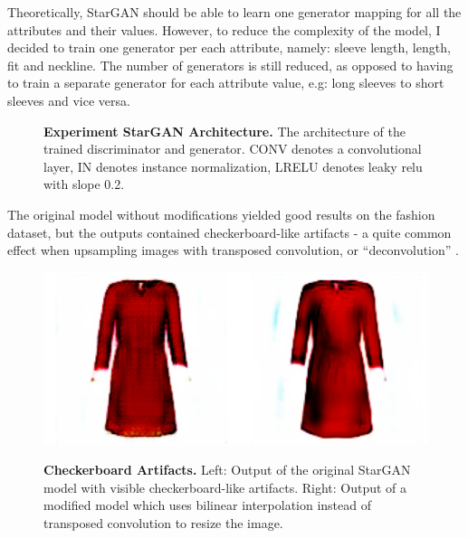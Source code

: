 \documentclass[12pt]{report}
\begin{document}
Theoretically, StarGAN should be able to learn one generator mapping for all the attributes and their values. However, to reduce the complexity of the model, I decided to train one generator per each attribute, namely: sleeve length, length, fit and neckline. The number of generators is still reduced, as opposed to having to train a separate generator for each attribute value, e.g: long sleeves to short sleeves and vice versa.

\vspace{0.5cm}
\begin{figure}[h]
\centering
{}\vspace{.5cm}
\caption{\label{fig:stargan_arch} \textbf{Experiment StarGAN Architecture.} The architecture of the trained  discriminator and generator. CONV denotes a convolutional layer, IN denotes instance normalization, LRELU denotes leaky relu with slope 0.2.}
\end{figure}

The original model without modifications yielded good results on the fashion dataset, but the outputs contained checkerboard-like artifacts - a quite common effect when upsampling images with transposed convolution, or ``deconvolution'' \cite{odena2016deconvolution}.

\begin{figure}[h]
\centering
{\includegraphics[width=.5\linewidth]{04_experiments/stargan/checkerboard}}
\caption{\label{fig:stargan_checkerboard} \textbf{Checkerboard Artifacts.} Left: Output of the original StarGAN model with visible checkerboard-like artifacts. Right: Output of a modified model which uses bilinear interpolation instead of transposed convolution to resize the image.}
\end{figure}
\end{document}
